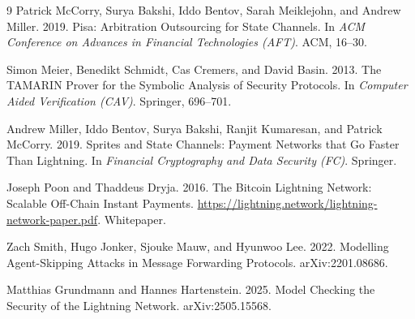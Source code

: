 \documentclass[sigconf,review]{acmart}
\theoremstyle{acmdefinition}
\begin{document}
\begin{thebibliography}{9}
Patrick McCorry, Surya Bakshi, Iddo Bentov, Sarah Meiklejohn, and Andrew Miller.
2019.
Pisa: Arbitration Outsourcing for State Channels.
In \emph{ACM Conference on Advances in Financial Technologies (AFT)}. ACM, 16--30.

Simon Meier, Benedikt Schmidt, Cas Cremers, and David Basin.
2013.
The TAMARIN Prover for the Symbolic Analysis of Security Protocols.
In \emph{Computer Aided Verification (CAV)}. Springer, 696--701.

Andrew Miller, Iddo Bentov, Surya Bakshi, Ranjit Kumaresan, and Patrick McCorry.
2019.
Sprites and State Channels: Payment Networks that Go Faster Than Lightning.
In \emph{Financial Cryptography and Data Security (FC)}. Springer.

Joseph Poon and Thaddeus Dryja.
2016.
The Bitcoin Lightning Network: Scalable Off-Chain Instant Payments.
\url{https://lightning.network/lightning-network-paper.pdf}. Whitepaper.

Zach Smith, Hugo Jonker, Sjouke Mauw, and Hyunwoo Lee.
2022.
Modelling Agent-Skipping Attacks in Message Forwarding Protocols. arXiv:2201.08686.

Matthias Grundmann and Hannes Hartenstein.
2025.
Model Checking the Security of the Lightning Network. arXiv:2505.15568.
\end{thebibliography}
\end{document}

